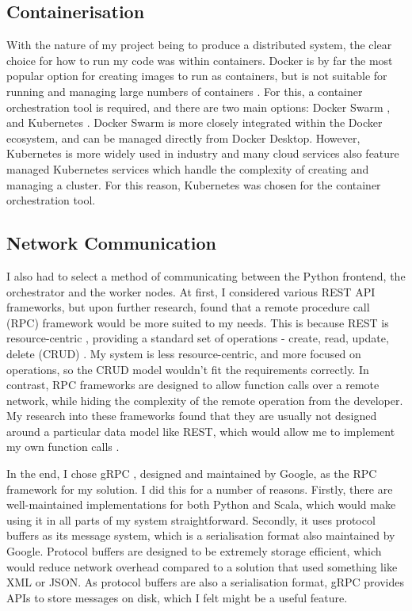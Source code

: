 \subsection{Containerisation}
With the nature of my project being to produce a distributed system, the clear choice for how to run my code was within containers. Docker  is by far the most popular option for creating images to run as containers, but is not suitable for running and managing large numbers of containers . For this, a container orchestration tool is required, and there are two main options: Docker Swarm , and Kubernetes . Docker Swarm is more closely integrated within the Docker ecosystem, and can be managed directly from Docker Desktop. However, Kubernetes is more widely used in industry  and many cloud services also feature  managed Kubernetes services which handle the complexity of creating and managing a cluster. For this reason, Kubernetes was chosen for the container orchestration tool.

\subsection{Network Communication} 
I also had to select a method of communicating between the Python frontend, the orchestrator and the worker nodes. At first, I considered various REST API frameworks, but upon further research, found that a remote procedure call (RPC) framework would be more suited to my needs. This is because REST is resource-centric , providing a standard set of operations - create, read, update, delete (CRUD) . My system is less resource-centric, and more focused on operations, so the CRUD model wouldn't fit the requirements correctly. In contrast, RPC frameworks are designed to allow function calls over a remote network, while hiding the complexity of the remote operation from the developer. My research into these frameworks found that they are usually not designed around a particular data model like REST, which would allow me to implement my own function calls . 

In the end, I chose gRPC , designed and maintained by Google, as the RPC framework for my solution. I did this for a number of reasons. Firstly, there are well-maintained implementations for both Python and Scala, which would make using it in all parts of my system straightforward. Secondly, it uses protocol buffers  as its message system, which is a serialisation format also maintained by Google. Protocol buffers are designed to be extremely storage efficient, which would reduce network overhead compared to a solution that used something like XML or JSON. As protocol buffers are also a serialisation format, gRPC provides APIs to store messages on disk, which I felt might be a useful feature.


